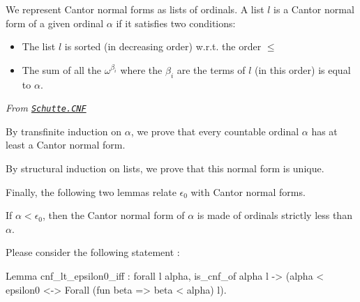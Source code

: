 {

We represent  Cantor normal forms as lists of ordinals.
A  list $l$ is a Cantor normal form of a given ordinal $\alpha$ if it satisfies two conditions:



\begin{itemize}
\item The list  $l$ is sorted (in decreasing order) w.r.t. the order $\leq$
\item The sum of all the  $\omega^{\beta_i}$ where the $\beta_i$ are the terms of $l$ (in this order) is equal to $\alpha$.
\end{itemize}



\vspace{4pt}

\noindent\emph{From \href{../theories/html/hydras.Schutte.CNF.html\#cnf_t}%
{\texttt{Schutte.CNF}}}






By transfinite induction on $\alpha$, we prove that every countable ordinal $\alpha$ 
 has at least a Cantor normal form.



By structural induction on lists, we prove that this normal form is unique.





Finally, the following two lemmas relate  $\epsilon_0$ with Cantor normal forms.

If $\alpha<\epsilon_0$, then the Cantor normal form of $\alpha$ is made of ordinals strictly less than $\alpha$.






\begin{exercise}
Please consider the following statement :

\begin{Coqsrc}
Lemma cnf_lt_epsilon0_iff : 
 forall l alpha, 
   is_cnf_of alpha l ->  
   (alpha < epsilon0 <->  Forall (fun beta =>  beta < alpha) l).
\end{Coqsrc}


\end{exercise}}
